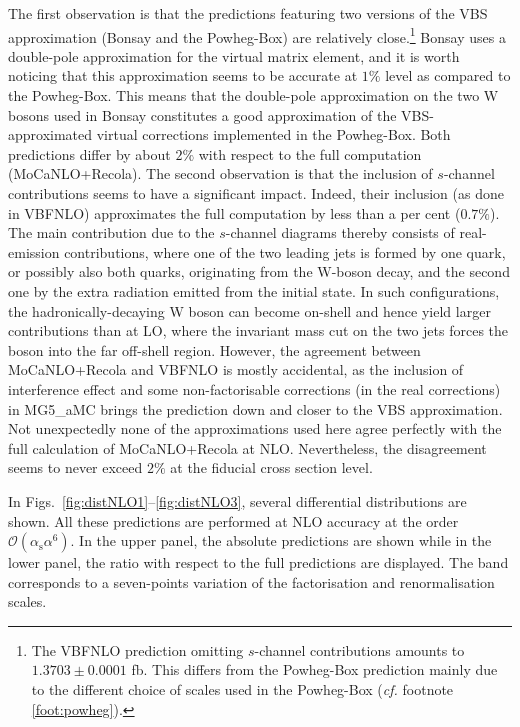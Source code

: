 \documentclass[twocolumn,epjc3]{svjour3} %
\newcommand{\alphas}{\ensuremath{\alpha_\text{s}}\xspace}
\begin{document}
    The first observation is that the predictions featuring two versions
    of the VBS approximation ({\sc Bonsay} and the {\sc Powheg-Box}) are
    relatively close.\footnote{The {\sc VBFNLO} prediction omitting
    $s$-channel contributions amounts to $1.3703 \pm 0.0001$ fb. This differs from
    the {\sc Powheg-Box} prediction mainly due to the different choice of
    scales used in the {\sc Powheg-Box} (\emph{cf.}
    footnote \ref{foot:powheg}).} {\sc Bonsay} uses a double-pole
    approximation for the virtual matrix element, and it is worth noticing
    that this approximation seems to be accurate at $1\%$ level as
    compared to the {\sc Powheg-Box}. This means that the double-pole
    approximation on the two W bosons used in {\sc Bonsay} constitutes a
    good approximation of the VBS-approxi\-mated virtual corrections
    implemented in the {\sc Powheg-Box}.  Both predictions differ by about
    $2\%$ with respect to the full computation ({\sc MoCaNLO+Recola}).
    The second observation is that the inclusion of $s$-channel
    contributions seems to have a significant impact.  Indeed, their
    inclusion (as done in {\sc VBFNLO}) approximates the full computation
    by less than a per cent ($0.7\%$). The main contribution due to 
    the $s$-channel diagrams thereby consists of real-emission
    contributions, where one of the two leading jets is formed by one
    quark, or possibly also both quarks, originating from the W-boson decay,
    and the second one by the extra radiation emitted from the initial
    state. In such configurations, the hadronically-decaying W boson can
    become on-shell and hence yield larger contributions than at LO, where
    the invariant mass cut on the two jets forces the boson into the far
    off-shell region.
    However, the agreement between {\sc MoCaNLO+Recola} and {\sc VBFNLO} is mostly accidental, as the inclusion of interference effect and some non-factorisable corrections (in the real corrections) in {\sc MG5\_aMC} brings the prediction down and closer to the VBS approximation.
    Not unexpectedly none of the approximations used here agree perfectly with the full calculation of {\sc MoCaNLO\-+Recola} at NLO.
    Nevertheless, the disagreement seems to never exceed $2\%$ at the fiducial cross section level.

    In Figs.~\ref{fig:distNLO1}--\ref{fig:distNLO3}, several differential distributions are shown.
    All these predictions are performed at NLO accuracy at the order $\mathcal{O}(\alphas\alpha^6)$.
    In the upper panel, the absolute predictions are shown while in the lower panel, the ratio with respect to the full predictions are displayed.
    The band corresponds to a seven-points variation of the factorisation and renormalisation scales.
\end{document}
